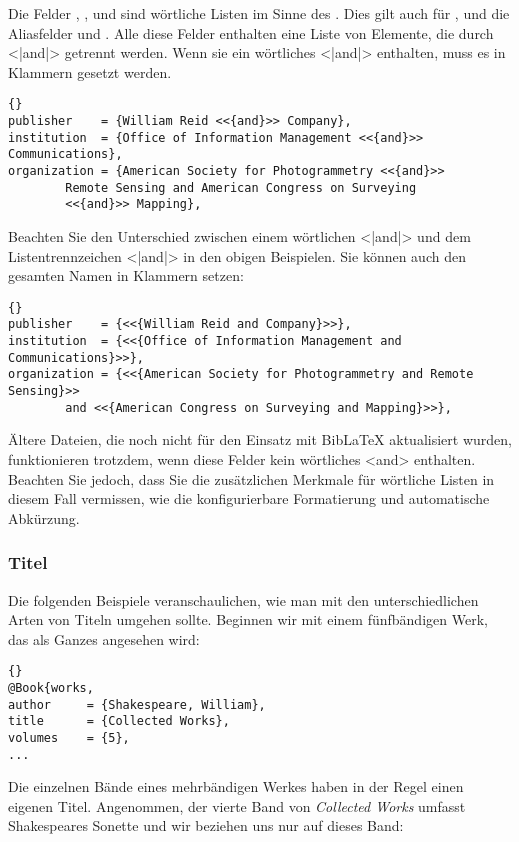 \documentclass{ltxdockit}[2011/03/25]
\newcommand*{\biblatex}{BibLaTeX\xspace}
\begin{document}
Die Felder , , 
und  sind wörtliche Listen  im Sinne des . Dies
gilt auch für ,  und die
Aliasfelder  und . Alle diese Felder
enthalten eine Liste von Elemente, die durch <|and|> getrennt werden. Wenn sie
ein wörtliches <|and|> enthalten, muss es in Klammern gesetzt werden.

\begin{lstlisting}[style=bibtex]{} 
publisher    = {William Reid <<{and}>> Company},
institution  = {Office of Information Management <<{and}>> Communications}, 
organization = {American Society for Photogrammetry <<{and}>>
		Remote Sensing and American Congress on Surveying 
		<<{and}>> Mapping},
\end{lstlisting}
%
Beachten Sie den Unterschied zwischen einem wörtlichen <|{and}|> und dem
Listentrennzeichen <|{and}|> in den obigen Beispielen. Sie können auch den
gesamten Namen in Klammern setzen:

\begin{lstlisting}[style=bibtex]{} 
publisher    = {<<{William Reid and Company}>>}, 
institution  = {<<{Office of Information Management and Communications}>>}, 
organization = {<<{American Society for Photogrammetry and Remote Sensing}>> 
		and <<{American Congress on Surveying and Mapping}>>},
\end{lstlisting}
%
Ältere Dateien, die noch nicht für den Einsatz mit \biblatex aktualisiert
wurden, funktionieren trotzdem, wenn diese Felder kein wörtliches <and>
enthalten. Beachten Sie jedoch, dass Sie die zusätzlichen Merkmale für wörtliche
Listen in diesem Fall vermissen, wie die konfigurierbare Formatierung und
automatische Abkürzung.

\subsubsection{Titel} \label{bib:use:ttl}

Die folgenden Beispiele veranschaulichen, wie man mit den unterschiedlichen
Arten von Titeln umgehen sollte. Beginnen wir mit einem fünfbändigen Werk, das
als Ganzes angesehen wird:

\begin{lstlisting}[style=bibtex]{} 
@Book{works, 
author     = {Shakespeare, William}, 
title      = {Collected Works}, 
volumes    = {5}, 
...
\end{lstlisting}
%
Die einzelnen Bände eines mehrbändigen Werkes haben in der Regel einen eigenen
Titel. Angenommen, der vierte Band von \emph{Collected Works} umfasst
Shakespeares Sonette und wir beziehen uns nur auf dieses Band:
\end{document}
